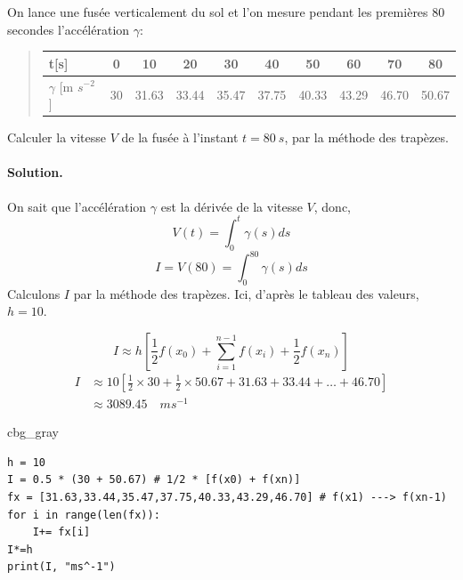 \documentclass[%
oneside,                 %
final,                   %
10pt,french]{article}
\newenvironment{_cod_tight}[1]{
   \def\FrameCommand{\colorbox{#1}}
   \FrameRule0.6pt\MakeFramed {\FrameRestore}\vskip3mm}
   {\vskip0mm\endMakeFramed}
\newenvironment{cod}[1]{
\bgroup\rmfamily
\fboxsep=0mm\relax
\begin{_cod_tight}{#1}
\list{}{\parsep=-2mm\parskip=0mm\topsep=0pt\leftmargin=2mm
\rightmargin=2\leftmargin\leftmargin=4pt\relax}
\item\relax}
{\endlist\end{_cod_tight}\egroup}
\newenvironment{doconceexercise}{}{}
\newcounter{doconceexercisecounter}
\begin{document}
\begin{doconceexercise}



On lance une fusée verticalement du sol et l’on mesure pendant les premières 80 secondes l'accélération $\gamma$:


\begin{quote}
\begin{tabular}{lccccccccc}
\hline
\multicolumn{1}{l}{ t[s] } & \multicolumn{1}{c}{ 0 } & \multicolumn{1}{c}{ 10 } & \multicolumn{1}{c}{ 20 } & \multicolumn{1}{c}{ 30 } & \multicolumn{1}{c}{ 40 } & \multicolumn{1}{c}{ 50 } & \multicolumn{1}{c}{ 60 } & \multicolumn{1}{c}{ 70 } & \multicolumn{1}{c}{ 80 } \\
\hline
$\gamma$ [m $s^{-2}$] & 30 & 31.63 & 33.44 & 35.47 & 37.75 & 40.33 & 43.29 & 46.70 & 50.67 \\
\hline
\end{tabular}
\end{quote}

\noindent
Calculer la vitesse $V$ de la fusée à l’instant $t=80 \ s$, par la méthode des trapèzes.


\paragraph{Solution.}
On sait que l’accélération $\gamma$ est la dérivée de la vitesse $V$, donc,
\begin{equation*}
V(t) = \int_0^t \gamma(s) ds
\end{equation*}
\begin{equation*}
I = V(80) = \int_0^{80} \gamma(s) ds
\end{equation*}
Calculons $I$ par la méthode des trapèzes. Ici, d’après le tableau des valeurs, $h = 10$.

\begin{equation*}
I \approx h \left[\frac{1}{2}f(x_0) + \sum_{i=1}^{n-1}f(x_i) + \frac{1}{2}f(x_n) \right]
\end{equation*}
\begin{align*}
I &\approx 10 \left[\frac{1}{2} \times 30 + \frac{1}{2} \times 50.67 + 31.63 + 33.44 + \ldots + 46.70 \right] \\
  &\approx 3089.45 \quad ms^{-1}
\end{align*}
\begin{cod}{cbg_gray}\begin{verbatim}
h = 10
I = 0.5 * (30 + 50.67) # 1/2 * [f(x0) + f(xn)]
fx = [31.63,33.44,35.47,37.75,40.33,43.29,46.70] # f(x1) ---> f(xn-1)
for i in range(len(fx)):
    I+= fx[i]
I*=h
print(I, "ms^-1")

\end{verbatim}
\end{cod}
\noindent


\end{doconceexercise}
\end{document}
